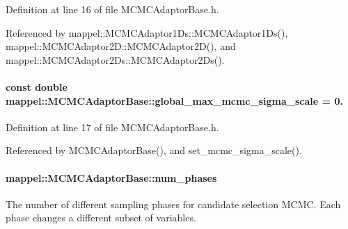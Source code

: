 Definition at line 16 of file M\+C\+M\+C\+Adaptor\+Base.\+h.



Referenced by mappel\+::\+M\+C\+M\+C\+Adaptor1\+Ds\+::\+M\+C\+M\+C\+Adaptor1\+Ds(), mappel\+::\+M\+C\+M\+C\+Adaptor2\+D\+::\+M\+C\+M\+C\+Adaptor2\+D(), and mappel\+::\+M\+C\+M\+C\+Adaptor2\+Ds\+::\+M\+C\+M\+C\+Adaptor2\+Ds().

\paragraph[{\texorpdfstring{global\+\_\+max\+\_\+mcmc\+\_\+sigma\+\_\+scale}{global_max_mcmc_sigma_scale}}]{\setlength{\rightskip}{0pt plus 5cm}const double mappel\+::\+M\+C\+M\+C\+Adaptor\+Base\+::global\+\_\+max\+\_\+mcmc\+\_\+sigma\+\_\+scale = 0.\hspace{0.3cm}{\ttfamily [static]}}\hypertarget{classmappel_1_1MCMCAdaptorBase_aebc93881ca351e67de867238a62579eb}{}\label{classmappel_1_1MCMCAdaptorBase_aebc93881ca351e67de867238a62579eb}


Definition at line 17 of file M\+C\+M\+C\+Adaptor\+Base.\+h.



Referenced by M\+C\+M\+C\+Adaptor\+Base(), and set\+\_\+mcmc\+\_\+sigma\+\_\+scale().

\paragraph[{\texorpdfstring{num\+\_\+phases}{num_phases}}]{ mappel\+::\+M\+C\+M\+C\+Adaptor\+Base\+::num\+\_\+phases\hspace{0.3cm}{\ttfamily [protected]}}\hypertarget{classmappel_1_1MCMCAdaptorBase_a44b90a984ace712584074dc17831fe25}{}\label{classmappel_1_1MCMCAdaptorBase_a44b90a984ace712584074dc17831fe25}
The number of different sampling phases for candidate selection M\+C\+MC. Each phase changes a different subset of variables. 

